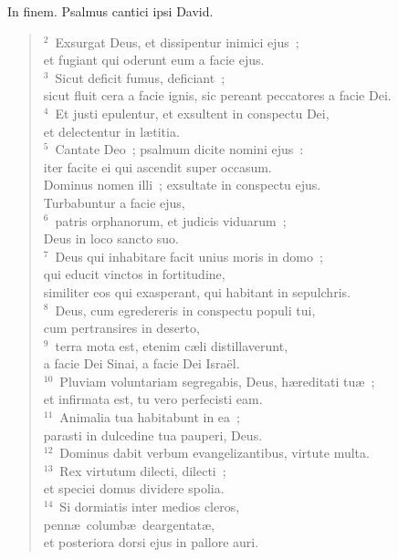 \lettrine[lines=3,image=true,loversize=0.05,lraise=-0.03]{I}{}n finem. Psalmus cantici ipsi David.
\begin{flushleft}\begin{verse}\vspace{6pt}${}^{2}$~Exsurgat Deus, et dissipentur inimici ejus~;\\ et fugiant qui oderunt eum a facie ejus.\\
${}^{3}$~Sicut deficit fumus, deficiant~;\\ sicut fluit cera a facie ignis, sic pereant peccatores a facie Dei.\\
${}^{4}$~Et justi epulentur, et exsultent in conspectu Dei,\\ et delectentur in l\ae titia.\\
${}^{5}$~Cantate Deo~; psalmum dicite nomini ejus~:\\ iter facite ei qui ascendit super occasum.\\ Dominus nomen illi~; exsultate in conspectu ejus.\\ Turbabuntur a facie ejus,\\
${}^{6}$~patris orphanorum, et judicis viduarum~;\\ Deus in loco sancto suo.\\
${}^{7}$~Deus qui inhabitare facit unius moris in domo~;\\ qui educit vinctos in fortitudine,\\ similiter eos qui exasperant, qui habitant in sepulchris.\\
${}^{8}$~Deus, cum egredereris in conspectu populi tui,\\ cum pertransires in deserto,\\
${}^{9}$~terra mota est, etenim c\ae li distillaverunt,\\ a facie Dei Sinai, a facie Dei Isra\"el.\\
${}^{10}$~Pluviam voluntariam segregabis, Deus, h\ae reditati tu\ae~;\\ et infirmata est, tu vero perfecisti eam.\\
${}^{11}$~Animalia tua habitabunt in ea~;\\ parasti in dulcedine tua pauperi, Deus.\\
${}^{12}$~Dominus dabit verbum evangelizantibus, virtute multa.\\
${}^{13}$~Rex virtutum dilecti, dilecti~;\\ et speciei domus dividere spolia.\\
${}^{14}$~Si dormiatis inter medios cleros,\\ penn\ae\ columb\ae\ deargentat\ae ,\\ et posteriora dorsi ejus in pallore auri.\\

\end{verse}
\end{flushleft}
